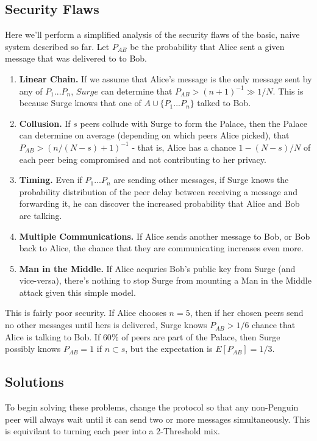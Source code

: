 \documentclass[twocolumn]{paper}
\begin{document}
\subsection{Security Flaws}
Here we'll perform a simplified analysis of the security flaws of the basic, naive system described so far. 
Let $P_{AB}$ be the probability that Alice sent a given message that was delivered to to Bob. 
\begin{enumerate}
\item\textbf{Linear Chain.} If we assume that Alice's message is the only message sent by any of $P_1 ... P_n$, $Surge$ can determine that $P_{AB} > (n+1)^{-1} \gg 1/N$. This is because Surge knows that one of $A \cup \{P_1 ... P_n\}$ talked to Bob.
\item\textbf{Collusion.} If  $s$ peers collude with Surge to form the Palace, then the Palace can determine on average (depending on which peers Alice picked), that $P_{AB} > (n/(N-s)+1)^{-1}$ - that is, Alice has a chance $1 - (N-s)/N$ of each peer being compromised and not contributing to her privacy.
\item\textbf{Timing.} Even if $P_1 ... P_n$ are sending other messages, if Surge knows the probability distribution of the peer delay between receiving a message and forwarding it, he can discover the increased probability that Alice and Bob are talking. 
\item\textbf{Multiple Communications.} If Alice sends another message to Bob, or Bob back to Alice, the chance that they are communicating increases even more. 
\item\textbf{Man in the Middle.} If Alice acquries Bob's public key from Surge (and vice-versa), there's nothing to stop Surge from mounting a Man in the Middle attack given this simple model. 
\end{enumerate}
This is fairly poor security. If Alice chooses $n = 5$, then if her chosen peers send no other messages until hers is delivered, Surge knows $P_{AB} > 1/6$ chance that Alice is talking to Bob. If $60\%$ of peers are part of the Palace, then Surge possibly knows $P_{AB} = 1$ if $n \subset s$, but the expectation is $E[P_{AB}] = 1/3$.

\subsection{Solutions}
To begin solving these problems, change the protocol so that any non-Penguin peer will always wait until it can send two or more messages simultaneously. This is equivilant to turning each peer into a 2-Threshold mix. \cite{TODO}
\end{document}
